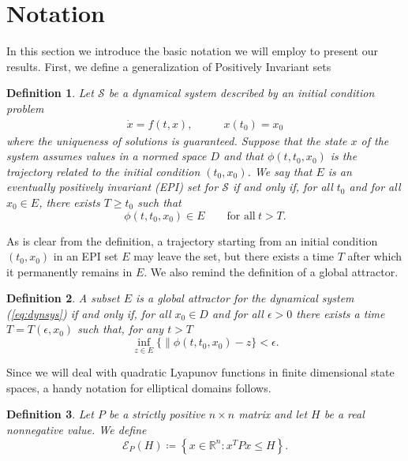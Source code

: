\documentclass[letterpaper,10pt,conference,twocolumn]{IEEEtran}
\newtheorem{dfn}{Definition}
\newcommand{\eps}{\epsilon}
\newcommand{\Real}{\mathbb{R}}
\newcommand{\ellips}{\mathcal{E}}
\begin{document}
\section{Notation}\label{sec:notation}
In this section we introduce the basic notation we will employ to present our results.
First, we define a generalization of Positively Invariant sets
\begin{dfn}
	Let $\mathcal{S}$ be a dynamical system described by an initial condition problem
	\begin{align}\label{eq:dynsys}
			\dot x = f(t,x), & \qquad x(t_0)=x_0
	\end{align}
	where the uniqueness of solutions is guaranteed. Suppose that the state $x$ of the system assumes values in a normed space $D$ and that $\phi(t,t_0,x_0)$ is the trajectory related to the initial condition $(t_0,x_0)$. We say that $E$ is an eventually positively invariant (EPI) set for $\mathcal{S}$ if and only if, for all $t_0$ and for all $x_0 \in E$, there exists $T\geq t_0$ such that
	\begin{equation}\nonumber
		\phi(t,t_0,x_0) \in E \qquad \text{for all}~t>T.
	\end{equation}
\end{dfn}
\noindent
As is clear from the definition, a trajectory starting from an initial condition $(t_0, x_0)$ in an EPI set $E$ may leave the set, but there exists a time $T$ after which it permanently remains in $E$.
We also remind the definition of a global attractor.
\begin{dfn}
	A subset $E$ is a global attractor for the dynamical system (\ref{eq:dynsys}) if and only if, for all $x_0\in D$ and for all $\eps>0$ there exists a time $T=T(\eps,x_0)$ such that, for any $t>T$
	\begin{equation}\nonumber
		\inf_{z\in E}\{\|\phi(t,t_0,x_0) -z \}<\eps.
	\end{equation}
\end{dfn}
\noindent
Since we will deal with quadratic Lyapunov functions in finite dimensional state spaces, a handy notation for elliptical domains follows.
\begin{dfn}
	Let $P$ be a strictly positive $n\times n$ matrix and let $H$ be a real nonnegative value. We define
	\begin{equation}\nonumber
		\ellips_P(H)\coloneqq 
			\left\{ 
				x\in \Real^n : x^T P x \leq H
			\right\}.
	\end{equation}
\end{dfn}
\end{document}
